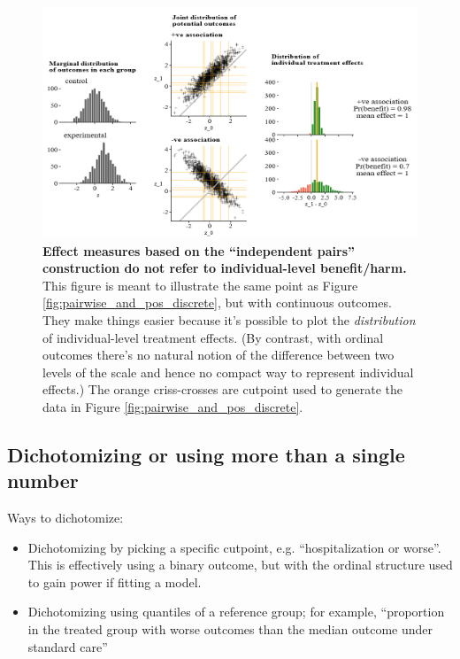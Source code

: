 \documentclass[
  11pt,
  fleqn
]{article}
\begin{document}
\begin{figure}
  \includegraphics[width=7in]{po_association_continuous.png}
  \caption{\textbf{Effect measures based on the ``independent pairs''
    construction do not refer to individual-level benefit/harm.}
    This figure is meant to illustrate the same point as Figure
    \ref{fig:pairwise_and_pos_discrete}, but with
    continuous outcomes. They make things easier because it's
    possible to plot the
    \emph{distribution} of individual-level treatment effects. (By
      contrast, with ordinal outcomes there's no natural notion of the
      difference between two levels of the scale and hence no compact way to
    represent individual effects.) The orange criss-crosses are
    cutpoint used to generate the data in Figure
    \ref{fig:pairwise_and_pos_discrete}.
  }
  \label{fig:pairwise_and_pos_continuous}
\end{figure}

\subsection{Dichotomizing or using more than a single number}

Ways to dichotomize:

\begin{itemize}
  \item Dichotomizing by picking a specific cutpoint,
    e.g. ``hospitalization or
    worse''. This is effectively using a binary outcome, but with the
    ordinal structure used to gain power if fitting a model.
  \item Dichotomizing using quantiles of a reference
    group; for example,
    ``proportion in the treated group with worse outcomes than the
    median outcome under standard care''
\end{itemize}
\end{document}
